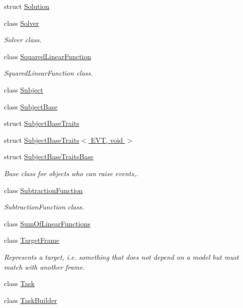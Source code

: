 \begin{DoxyCompactItemize}
struct \hyperlink{structocra_1_1Solution}{Solution}
\item 
class \hyperlink{classocra_1_1Solver}{Solver}
\begin{DoxyCompactList}\small\item\em Solver class. \end{DoxyCompactList}\item 
class \hyperlink{classocra_1_1SquaredLinearFunction}{Squared\+Linear\+Function}
\begin{DoxyCompactList}\small\item\em Squared\+Linear\+Function class. \end{DoxyCompactList}\item 
class \hyperlink{classocra_1_1Subject}{Subject}
\item 
class \hyperlink{classocra_1_1SubjectBase}{Subject\+Base}
\item 
struct \hyperlink{structocra_1_1SubjectBaseTraits}{Subject\+Base\+Traits}
\item 
struct \hyperlink{structocra_1_1SubjectBaseTraits_3_01EVT_00_01void_01_4}{Subject\+Base\+Traits$<$ E\+V\+T, void $>$}
\item 
struct \hyperlink{structocra_1_1SubjectBaseTraitsBase}{Subject\+Base\+Traits\+Base}
\begin{DoxyCompactList}\small\item\em Base class for objects who can raise events,. \end{DoxyCompactList}\item 
class \hyperlink{classocra_1_1SubtractionFunction}{Subtraction\+Function}
\begin{DoxyCompactList}\small\item\em Subtraction\+Function class. \end{DoxyCompactList}\item 
class \hyperlink{classocra_1_1SumOfLinearFunctions}{Sum\+Of\+Linear\+Functions}
\item 
class \hyperlink{classocra_1_1TargetFrame}{Target\+Frame}
\begin{DoxyCompactList}\small\item\em Represents a \textquotesingle{}target\textquotesingle{}, i.\+e. something that does not depend on a model but must match with another frame. \end{DoxyCompactList}\item 
class \hyperlink{classocra_1_1Task}{Task}
\item 
class \hyperlink{classocra_1_1TaskBuilder}{Task\+Builder}
\item 

\end{DoxyCompactItemize}
